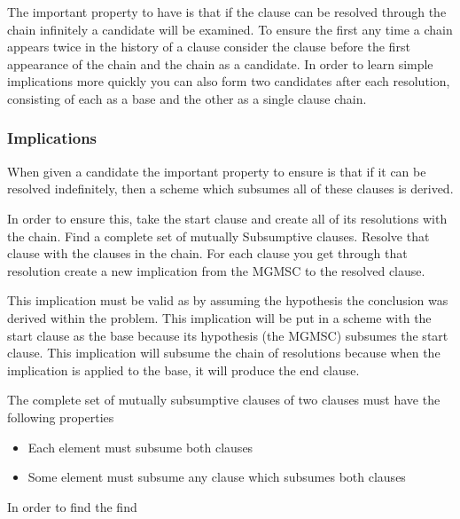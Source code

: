 \documentclass{article}
\begin{document}
The important property to have is that
if the clause can be resolved through the chain infinitely a candidate will be examined.
To ensure the first any time a chain appears twice in the history of a clause
consider the clause before the first appearance of the chain and the chain as a candidate.
In order to learn simple implications more quickly you can also form two candidates after each resolution,
consisting of each as a base and the other as a single clause chain.

\subsubsection{Implications}

When given a candidate the important property to ensure is that if it can be resolved indefinitely,
then a scheme which subsumes all of these clauses is derived.

In order to ensure this, take the start clause and create all of its resolutions with the chain.
Find a complete set of mutually Subsumptive clauses.
Resolve that clause with the clauses in the chain.
For each clause you get through that resolution create a new implication from the MGMSC to the resolved clause.

This implication must be valid as by assuming the hypothesis the conclusion was derived within the problem.
This implication will be put in a scheme with the start clause as the base because its hypothesis (the MGMSC) subsumes the start clause.
This implication will subsume the chain of resolutions because when the implication is applied to the base,
  it will produce the end clause.

The complete set of mutually subsumptive clauses of two clauses must have the following properties
\begin{itemize}
  \item Each element must subsume both clauses
  \item Some element must subsume any clause which subsumes both clauses
\end{itemize}

In order to find the  find
\end{document}
